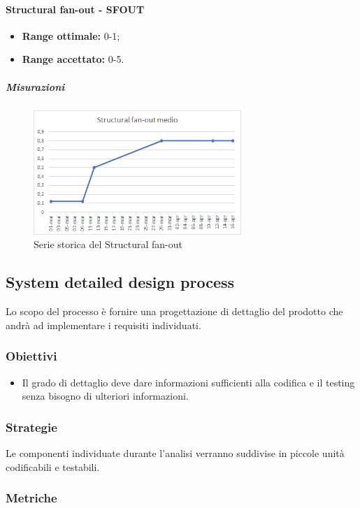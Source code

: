 			\paragraph{Structural fan-out - SFOUT} \Spazio
			\begin{itemize}
				\item \textbf{Range ottimale:} 0-1;
				\item \textbf{Range accettato:} 0-5.
			\end{itemize}
		    \subparagraph{Misurazioni}
		    \begin{figure}[H]
		    	\centering 
		    	\includegraphics[width=0.7\textwidth]{Images/SFOUT.png}
		    	\caption{Serie storica del Structural fan-out}
		    	\label{SFOUT} 
		    \end{figure}
            

\subsection{System detailed design process}
Lo scopo del processo è fornire una progettazione di dettaglio del prodotto che andrà ad implementare i requisiti individuati.
		\subsubsection{Obiettivi}
		\begin{itemize}
			\item Il grado di dettaglio deve dare informazioni sufficienti alla codifica e il testing senza bisogno di ulteriori informazioni.
		\end{itemize}
		\subsubsection{Strategie}
		Le componenti individuate durante l'analisi verranno suddivise in piccole unità codificabili e testabili.
		\subsubsection{Metriche}
